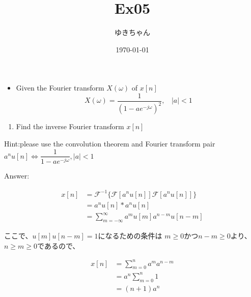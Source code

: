 \documentclass[a4paper,16pt]{jsarticle}
\title{Ex05}
\author{ゆきちゃん}
\date{\today}
\begin{document}
\maketitle

\begin{itemize}
	\item Given the Fourier transform $X(\omega)$ of $x[n]$
	\begin{equation}
		X(\omega) = \dfrac{1}{(1-ae^{-j\omega})^2},~~~~|a| < 1
	\end{equation}
\end{itemize}
\begin{enumerate}
	\item Find the inverse Fourier transform $x[n]$
\end{enumerate}

Hint:please use the convolution theorem and Fourier transform pair $a^n u[n] \iff \dfrac{1}{1-ae^{-j\omega}}, |a| < 1$

Answer:

\begin{align}
	x[n] &= \mathcal{F}^{-1}\{\mathcal{F}[a^nu[n]]\mathcal{F}[a^nu[n]]\} \\
	&= a^nu[n]*a^nu[n] \\
	&= \sum_{m=-\infty}^\infty a^m u[m]a^{n-m}u[n-m]
\end{align}

ここで、$u[m]u[n-m] = 1$になるための条件は
$m \geq 0$かつ$n-m \geq 0$より、$n \geq m \geq 0$であるので、

\begin{align}
	x[n] &= \sum_{m = 0}^n a^m a^{n-m} \\
	&= a^n\sum_{m = 0}^n 1 \\
	&= (n+1)a^n
\end{align}
\end{document}
